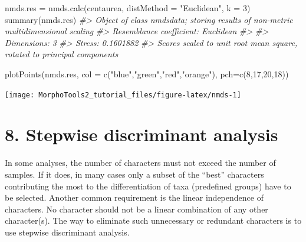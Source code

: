 \documentclass[
  11pt,
  a4paper]{article}
\newenvironment{Shaded}{\begin{snugshade}}{\end{snugshade}}
\newcommand{\AttributeTok}[1]{\textcolor[rgb]{0.77,0.63,0.00}{#1}}
\newcommand{\CommentTok}[1]{\textcolor[rgb]{0.56,0.35,0.01}{\textit{#1}}}
\newcommand{\DecValTok}[1]{\textcolor[rgb]{0.00,0.00,0.81}{#1}}
\newcommand{\FunctionTok}[1]{\textcolor[rgb]{0.00,0.00,0.00}{#1}}
\newcommand{\NormalTok}[1]{#1}
\newcommand{\OtherTok}[1]{\textcolor[rgb]{0.56,0.35,0.01}{#1}}
\newcommand{\StringTok}[1]{\textcolor[rgb]{0.31,0.60,0.02}{#1}}
\begin{document}
\begin{Shaded}
\begin{Highlighting}[]
\NormalTok{nmds.res }\OtherTok{=} \FunctionTok{nmds.calc}\NormalTok{(centaurea, }\AttributeTok{distMethod =} \StringTok{"Euclidean"}\NormalTok{, }\AttributeTok{k =} \DecValTok{3}\NormalTok{)}
\FunctionTok{summary}\NormalTok{(nmds.res)}
\CommentTok{\#\textgreater{} Object of class \textquotesingle{}nmdsdata\textquotesingle{}; storing results of non{-}metric multidimensional scaling}
\CommentTok{\#\textgreater{} Resemblance coefficient:  Euclidean }
\CommentTok{\#\textgreater{} }
\CommentTok{\#\textgreater{} Dimensions:  3}
\CommentTok{\#\textgreater{} Stress:  0.1601882}
\CommentTok{\#\textgreater{} Scores scaled to unit root mean square, rotated to principal components}
\end{Highlighting}
\end{Shaded}

\vspace{-0.6cm}

\begin{Shaded}
\begin{Highlighting}[]
\FunctionTok{plotPoints}\NormalTok{(nmds.res, }\AttributeTok{col =} \FunctionTok{c}\NormalTok{(}\StringTok{"blue"}\NormalTok{,}\StringTok{"green"}\NormalTok{,}\StringTok{"red"}\NormalTok{,}\StringTok{"orange"}\NormalTok{), }\AttributeTok{pch=}\FunctionTok{c}\NormalTok{(}\DecValTok{8}\NormalTok{,}\DecValTok{17}\NormalTok{,}\DecValTok{20}\NormalTok{,}\DecValTok{18}\NormalTok{))}
\end{Highlighting}
\end{Shaded}

\begin{center}\texttt{[image: MorphoTools2\_tutorial\_files/figure-latex/nmds-1]} \end{center}

\newpage

\hypertarget{stepwise-discriminant-analysis}{%
\section{8. Stepwise discriminant
analysis}\label{stepwise-discriminant-analysis}}

In some analyses, the number of characters must not exceed the number of
samples. If it does, in many cases only a subset of the ``best''
characters contributing the most to the differentiation of taxa
(predefined groups) have to be selected. Another common requirement is
the linear independence of characters. No character should not be a
linear combination of any other character(s). The way to eliminate such
unnecessary or redundant characters is to use stepwise discriminant
analysis.
\end{document}
